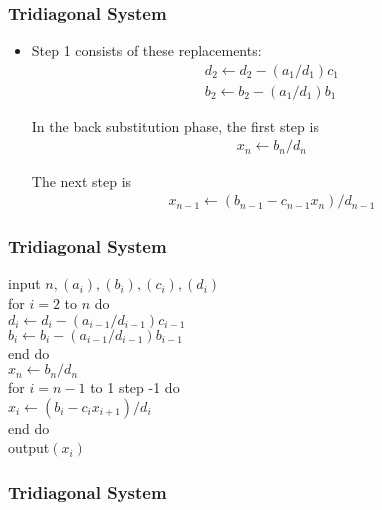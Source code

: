 \documentclass[notheorems,mathserif,table,compress]{beamer}  %
\begin{document}
\begin{frame}
\frametitle{Tridiagonal System}
\begin{itemize}
\item Step 1 consists of these replacements:
\begin{eqnarray*}
d_2\leftarrow d_2-(a_1/d_1)c_1\\
b_2\leftarrow b_2-(a_1/d_1)b_1
\end{eqnarray*}

In the back substitution phase, the first step is
\begin{eqnarray*}
x_n\leftarrow b_n/d_n
\end{eqnarray*}

The next step is
\begin{eqnarray*}
x_{n-1}\leftarrow (b_{n-1}-c_{n-1}x_n)/d_{n-1}
\end{eqnarray*}
\end{itemize}
\end{frame}

\begin{frame}
\frametitle{Tridiagonal System}
input $n,(a_i),(b_i),(c_i),(d_i)$\\
for $i=2$ to $n$ do\\
\quad $d_i \gets d_i-(a_{i-1}/d_{i-1})c_{i-1}$\\
\quad $b_i \gets b_i-(a_{i-1}/d_{i-1})b_{i-1}$\\
end do\\
$x_n \gets b_n/d_n$\\
for $i=n-1$ to 1 step -1 do\\
\quad $x_i \gets (b_i-c_ix_{i+1})/d_i$\\
end do\\
output$(x_i)$
\end{frame}

\begin{frame}
\frametitle{Tridiagonal System}

\end{frame}
\end{document}
